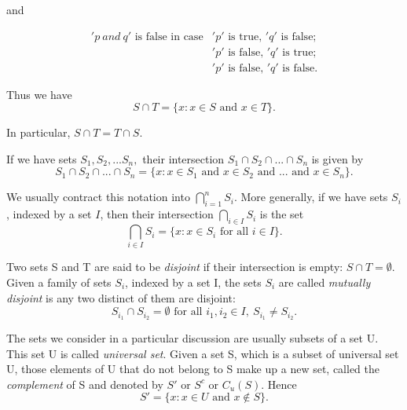 \documentclass[11pt]{amsbook}
\begin{document}


and

\begin{align*}
    \text{\('p\ and\  q'\) is\ false in case} & \text{\('p'\) is true, \('q'\) is false;}\\
    &\text{\('p'\) is false, \('q'\) is true;} \\
    &\text{\('p'\) is false, \('q'\) is false.}
\end{align*}
  

Thus we have
\[ S \cap T = \lbrace x : x \in S \text{ and } x \in T \rbrace.\]

In particular, \( S \cap T = T \cap S.\)


If we have sets \(S_1, S_2, ... S_n,\) their intersection \(S_1 \cap S_2 \cap ... \cap S_n\) is given by
\[S_1 \cap S_2 \cap ... \cap S_n = \lbrace x: x \in S_1 \text{ and } x \in S_2 \text{ and ... and } x \in S_n \rbrace. \]

We usually contract this notation into \(\bigcap_{i=1}^{n} S_i\). More generally, if we have sets \(S_i\), indexed by a set \(I\), then their intersection \(\bigcap_{i \in I} S_i\) is the set 
\[\bigcap_{i \in I} S_i =  \lbrace x: x \in S_i \text{ for all }i \in I \rbrace.\]


Two sets S and T are said to be \textit{disjoint} if their intersection is empty: \(S \cap T = \emptyset\). Given a family of sets \(S_i\), indexed by a set I, the sets \(S_i\) are called \textit{mutually disjoint} is any two distinct of them are disjoint:
\[S_i_1 \cap S_i_2 = \emptyset \text{ for all } i_1, i_2 \in I, \ S_i_1 \neq S_i_2\text{.}\]


The sets we consider in a particular discussion are usually subsets of a set U. This set U is called \textit{universal set}. Given a set S, which is a subset of universal set U, those elements of U that do not belong to S make up a new set, called the \textit{complement} of S and denoted by \(S'\) or \(S^c\) or \(C_u(S)\). Hence
\[S' = \lbrace x: x \in U \text{ and } x \notin S \rbrace .\]
\end{document}
